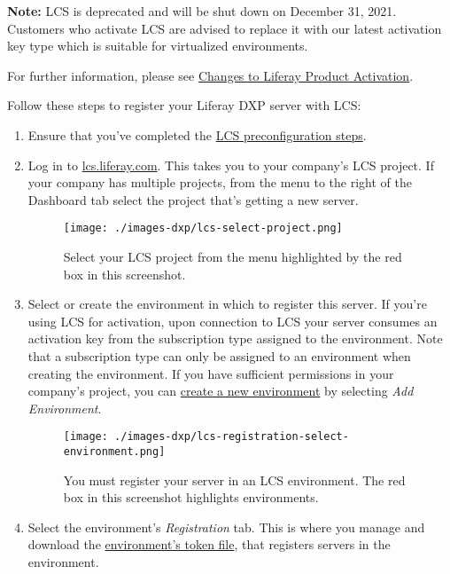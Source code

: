 \noindent\hrulefill

\textbf{Note:} LCS is deprecated and will be shut down on December 31,
2021. Customers who activate LCS are advised to replace it with our
latest activation key type which is suitable for virtualized
environments.

For further information, please see
\href{https://help.liferay.com/hc/en-us/articles/4402347960845-Changes-to-Liferay-Product-Activation}{Changes
to Liferay Product Activation}.

\noindent\hrulefill

Follow these steps to register your Liferay DXP server with LCS:

\begin{enumerate}
\def\labelenumi{\arabic{enumi}.}
\item
  Ensure that you've completed the
  \href{/docs/7-0/deploy/-/knowledge_base/d/lcs-preconfiguration}{LCS
  preconfiguration steps}.
\item
  Log in to \href{https://lcs.liferay.com}{lcs.liferay.com}. This takes
  you to your company's LCS project. If your company has multiple
  projects, from the menu to the right of the Dashboard tab select the
  project that's getting a new server.

  \begin{figure}
  \centering
  \texttt{[image: ./images-dxp/lcs-select-project.png]}
  \caption{Select your LCS project from the menu highlighted by the red
  box in this screenshot.}
  \end{figure}
\item
  Select or create the environment in which to register this server. If
  you're using LCS for activation, upon connection to LCS your server
  consumes an activation key from the subscription type assigned to the
  environment. Note that a subscription type can only be assigned to an
  environment when creating the environment. If you have sufficient
  permissions in your company's project, you can
  \href{/docs/7-0/deploy/-/knowledge_base/d/using-lcs\#creating-an-environment}{create
  a new environment} by selecting \emph{Add Environment}.

  \begin{figure}
  \centering
  \texttt{[image: ./images-dxp/lcs-registration-select-environment.png]}
  \caption{You must register your server in an LCS environment. The red
  box in this screenshot highlights environments.}
  \end{figure}
\item
  Select the environment's \emph{Registration} tab. This is where you
  manage and download the
  \href{/docs/7-0/deploy/-/knowledge_base/d/using-lcs\#using-environment-tokens}{environment's
  token file}, that registers servers in the environment.


\end{enumerate}
